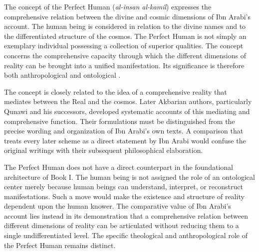 \label{para:VS.B01.P01.C08.S16.SS13.P001}

The concept of the Perfect Human
(\textit{al-insan al-kamil}) expresses the
comprehensive relation between the divine and
cosmic dimensions of Ibn Arabi's account. The
human being is considered in relation to the
divine names and to the differentiated structure
of the cosmos. The Perfect Human is not simply
an exemplary individual possessing a collection
of superior qualities. The concept concerns
the comprehensive capacity through which the
different dimensions of reality can be brought
into a unified manifestation. Its significance
is therefore both anthropological and ontological
\citep{ChittickSelfDisclosureGod1998}.

\label{para:VS.B01.P01.C08.SS13.P002}

The concept is closely related to the idea of
a comprehensive reality that mediates between
the Real and the cosmos. Later Akbarian authors,
particularly Qunawi and his successors, developed
systematic accounts of this mediating and
comprehensive function. Their formulations
must be distinguished from the precise wording
and organization of Ibn Arabi's own texts.
A comparison that treats every later scheme
as a direct statement by Ibn Arabi would
confuse the original writings with their
subsequent philosophical elaboration.

\label{para:VS.B01.P01.C08.SS13.P003}

The Perfect Human does not have a direct
counterpart in the foundational architecture
of Book I. The human being is not assigned
the role of an ontological center merely because
human beings can understand, interpret, or
reconstruct manifestations. Such a move would
make the existence and structure of reality
dependent upon the human knower. The comparative
value of Ibn Arabi's account lies instead in
its demonstration that a comprehensive relation
between different dimensions of reality can
be articulated without reducing them to a
single undifferentiated level. The specific
theological and anthropological role of the
Perfect Human remains distinct.



